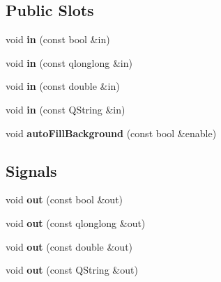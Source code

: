 \subsection*{Public Slots}
\begin{DoxyCompactItemize}
\item 
\hypertarget{classQELink_ab34528168fc1e2030212ac0d249ce3c7}{
void {\bfseries in} (const bool \&in)}
\label{classQELink_ab34528168fc1e2030212ac0d249ce3c7}

\item 
\hypertarget{classQELink_a38ae1392e7774502c80728a81771f879}{
void {\bfseries in} (const qlonglong \&in)}
\label{classQELink_a38ae1392e7774502c80728a81771f879}

\item 
\hypertarget{classQELink_aba549d32f48240d619667b2078aa7878}{
void {\bfseries in} (const double \&in)}
\label{classQELink_aba549d32f48240d619667b2078aa7878}

\item 
\hypertarget{classQELink_ae635a10a35878aa8b36f61162288005e}{
void {\bfseries in} (const QString \&in)}
\label{classQELink_ae635a10a35878aa8b36f61162288005e}

\item 
\hypertarget{classQELink_ab54cbbfe1177ee623a990e408cb3e904}{
void {\bfseries autoFillBackground} (const bool \&enable)}
\label{classQELink_ab54cbbfe1177ee623a990e408cb3e904}

\end{DoxyCompactItemize}
\subsection*{Signals}
\begin{DoxyCompactItemize}
\item 
\hypertarget{classQELink_a4146b853a4ba30220f489d977498bb6a}{
void {\bfseries out} (const bool \&out)}
\label{classQELink_a4146b853a4ba30220f489d977498bb6a}

\item 
\hypertarget{classQELink_a82c149a101980f3959fe38b87e1f6859}{
void {\bfseries out} (const qlonglong \&out)}
\label{classQELink_a82c149a101980f3959fe38b87e1f6859}

\item 
\hypertarget{classQELink_a17c74630163d08c94bbcc058a1c5f19c}{
void {\bfseries out} (const double \&out)}
\label{classQELink_a17c74630163d08c94bbcc058a1c5f19c}

\item 
\hypertarget{classQELink_ac765dc648d35f6fb0ad748dfd0afd56a}{
void {\bfseries out} (const QString \&out)}
\label{classQELink_ac765dc648d35f6fb0ad748dfd0afd56a}

\end{DoxyCompactItemize}
